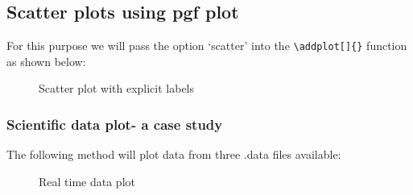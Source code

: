 \documentclass{article}
\begin{document}
\subsection{Scatter plots using pgf plot}
For this purpose we will pass the option `scatter' into the \verb+\addplot[]{}+ function as shown below:
\begin{figure}[H]
    \centering
{}  
\caption{Scatter plot with explicit labels}
    \label{fig:my_label}
\end{figure}
\subsubsection{Scientific data plot- a case study}
The following method will plot data from three .data files available:
\begin{figure}[H]
    \centering
    
    
    \caption{Real time data plot}
    \label{fig:my_label}
\end{figure}
\end{document}
